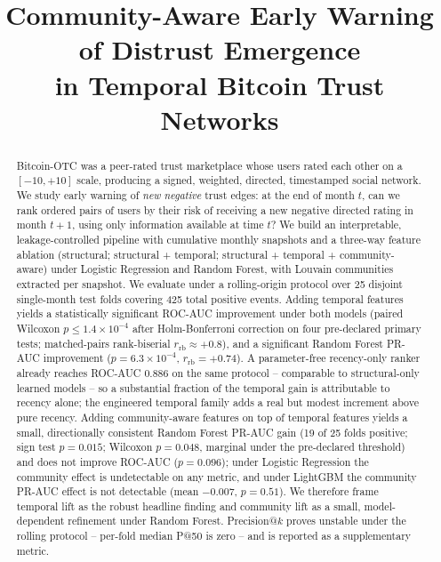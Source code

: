 \documentclass[conference]{IEEEtran}
\begin{document}
\title{Community-Aware Early Warning of Distrust Emergence \\
in Temporal Bitcoin Trust Networks}

\author{
}

\maketitle

\begin{abstract}
Bitcoin-OTC was a peer-rated trust marketplace whose users rated each
other on a $[-10, +10]$ scale, producing a signed, weighted, directed,
timestamped social network. We study early warning of \emph{new
negative} trust edges: at the end of month $t$, can we rank ordered
pairs of users by their risk of receiving a new negative directed
rating in month $t{+}1$, using only information available at time $t$?
We build an interpretable, leakage-controlled pipeline with cumulative
monthly snapshots and a three-way feature ablation
(structural; structural + temporal; structural + temporal + community-aware)
under Logistic Regression and Random Forest, with Louvain communities
extracted per snapshot. We evaluate under a rolling-origin protocol
over 25 disjoint single-month test folds covering 425 total positive
events. Adding temporal features yields a statistically significant
ROC-AUC improvement under both models (paired Wilcoxon
$p \leq 1.4\!\times\!10^{-4}$ after Holm-Bonferroni correction on
four pre-declared primary tests; matched-pairs rank-biserial
$r_{\mathrm{rb}} \approx +0.8$), and a significant Random Forest PR-AUC
improvement ($p = 6.3\!\times\!10^{-4}$, $r_{\mathrm{rb}} = +0.74$). A
parameter-free recency-only ranker already reaches ROC-AUC $0.886$ on
the same protocol -- comparable to structural-only learned models --
so a substantial fraction of the temporal gain is attributable to
recency alone; the engineered temporal family adds a real but modest
increment above pure recency. Adding community-aware features on top
of temporal features yields a small, directionally consistent Random
Forest PR-AUC gain (19 of 25 folds positive; sign test $p = 0.015$;
Wilcoxon $p = 0.048$, marginal under the pre-declared threshold) and
does not improve ROC-AUC ($p = 0.096$); under Logistic Regression the
community effect is undetectable on any metric, and under LightGBM
the community PR-AUC effect is not detectable
(mean $-0.007$, $p = 0.51$). We therefore frame temporal lift as
the robust headline finding and community lift as a small,
model-dependent refinement under Random Forest. Precision@$k$ proves
unstable under the rolling protocol -- per-fold median P@50 is zero --
and is reported as a supplementary metric.
\end{abstract}
\end{document}
